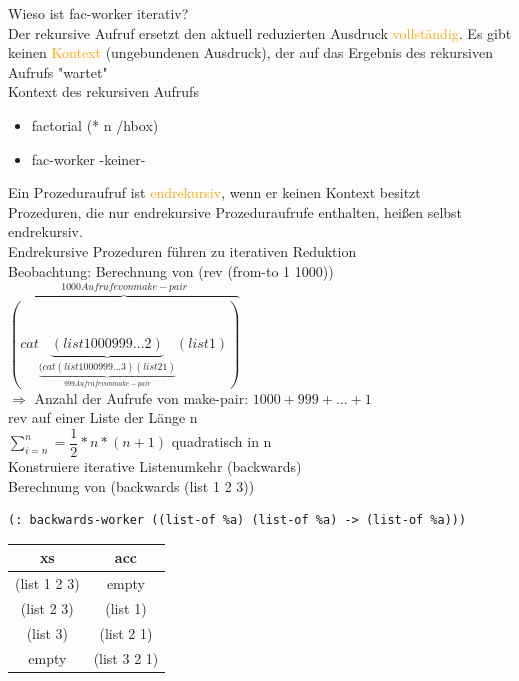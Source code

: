 \documentclass[paper=a4, fontsize=11pt]{scrartcl}
\numberwithin{equation}{section}
\numberwithin{figure}{section}
\numberwithin{table}{section}
\begin{document}
\begin{lstlistig}
Wieso ist fac-worker iterativ? \\
Der rekursive Aufruf ersetzt den aktuell reduzierten Ausdruck \textcolor{orange}{vollständig}. Es gibt keinen \textcolor{orange}{Kontext} (ungebundenen Ausdruck), der auf das Ergebnis des rekursiven Aufrufs "wartet" \\
Kontext des rekursiven Aufrufs \\
\begin{itemize}
\item factorial (* n /hbox)
\item fac-worker -keiner-
\end{itemize}

Ein Prozeduraufruf ist \textcolor{orange}{endrekursiv}, wenn er keinen Kontext besitzt \\
Prozeduren, die nur endrekursive Prozeduraufrufe enthalten, heißen selbst endrekursiv. \\
Endrekursive Prozeduren führen zu iterativen Reduktion \\

Beobachtung: Berechnung von (rev (from-to 1 1000)) \\
$\overbrace{(cat \underbrace{(list 1000 999 ... 2)}_{\underbrace{(cat (list 1000 999 ... 3) (list 2 1)}_{999 Aufrufe von make-pair}} (list 1))}^{1000 Aufrufe von make-pair} $\\

$\Rightarrow$ Anzahl der Aufrufe von make-pair: $1000+999+...+1$ \\
rev auf einer Liste der Länge n \\
$\sum^{n}_{i=n}= \dfrac{1}{2} * n * (n+1)$ quadratisch in n \\

Konstruiere iterative Listenumkehr (backwards) \\
Berechnung von (backwards (list 1 2 3)) \\

\begin{lstlisting}
(: backwards-worker ((list-of %a) (list-of %a) -> (list-of %a)))
\end{lstlisting}

\begin{tabular}{c|c}
xs & acc \\\hline
(list 1 2 3) & empty \\
(list 2 3) & (list 1) \\
(list 3) & (list 2 1) \\
empty & (list 3 2 1) 
\end{tabular}

\end{lstlistig}
\end{document}
